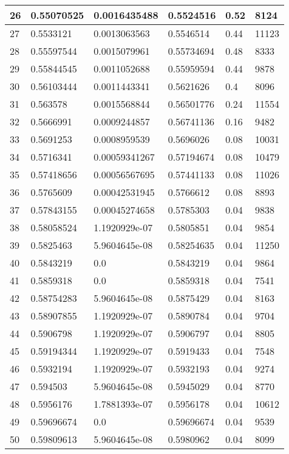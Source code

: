 \begin{longtable}{|l|l|l|l|l|l|}
26 & 0.55070525 & 0.0016435488 & 0.5524516 & 0.52 & 8124 \\ \hline 
27 & 0.5533121 & 0.0013063563 & 0.5546514 & 0.44 & 11123 \\ \hline 
28 & 0.55597544 & 0.0015079961 & 0.55734694 & 0.48 & 8333 \\ \hline 
29 & 0.55844545 & 0.0011052688 & 0.55959594 & 0.44 & 9878 \\ \hline 
30 & 0.56103444 & 0.0011443341 & 0.5621626 & 0.4 & 8096 \\ \hline 
31 & 0.563578 & 0.0015568844 & 0.56501776 & 0.24 & 11554 \\ \hline 
32 & 0.5666991 & 0.0009244857 & 0.56741136 & 0.16 & 9482 \\ \hline 
33 & 0.5691253 & 0.0008959539 & 0.5696026 & 0.08 & 10031 \\ \hline 
34 & 0.5716341 & 0.00059341267 & 0.57194674 & 0.08 & 10479 \\ \hline 
35 & 0.57418656 & 0.00056567695 & 0.57441133 & 0.08 & 11026 \\ \hline 
36 & 0.5765609 & 0.00042531945 & 0.5766612 & 0.08 & 8893 \\ \hline 
37 & 0.57843155 & 0.00045274658 & 0.5785303 & 0.04 & 9838 \\ \hline 
38 & 0.58058524 & 1.1920929e-07 & 0.5805851 & 0.04 & 9854 \\ \hline 
39 & 0.5825463 & 5.9604645e-08 & 0.58254635 & 0.04 & 11250 \\ \hline 
40 & 0.5843219 & 0.0 & 0.5843219 & 0.04 & 9864 \\ \hline 
41 & 0.5859318 & 0.0 & 0.5859318 & 0.04 & 7541 \\ \hline 
42 & 0.58754283 & 5.9604645e-08 & 0.5875429 & 0.04 & 8163 \\ \hline 
43 & 0.58907855 & 1.1920929e-07 & 0.5890784 & 0.04 & 9704 \\ \hline 
44 & 0.5906798 & 1.1920929e-07 & 0.5906797 & 0.04 & 8805 \\ \hline 
45 & 0.59194344 & 1.1920929e-07 & 0.5919433 & 0.04 & 7548 \\ \hline 
46 & 0.5932194 & 1.1920929e-07 & 0.5932193 & 0.04 & 9274 \\ \hline 
47 & 0.594503 & 5.9604645e-08 & 0.5945029 & 0.04 & 8770 \\ \hline 
48 & 0.5956176 & 1.7881393e-07 & 0.5956178 & 0.04 & 10612 \\ \hline 
49 & 0.59696674 & 0.0 & 0.59696674 & 0.04 & 9539 \\ \hline 
50 & 0.59809613 & 5.9604645e-08 & 0.5980962 & 0.04 & 8099 \\ \hline 

\end{longtable}

